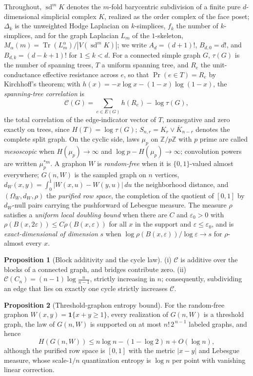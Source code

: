 \documentclass[11pt]{article}
\theoremstyle{definition}
\newtheorem{proposition}{Proposition}
\begin{document}
Throughout, $\operatorname{sd}^mK$ denotes the $m$-fold barycentric subdivision of a finite pure $d$-dimensional simplicial complex $K$, realized as the order complex of the face poset; $\Delta_k$ is the unweighted Hodge Laplacian on $k$-simplices, $f_k$ the number of $k$-simplices, and for the graph Laplacian $L_m$ of the $1$-skeleton, $M_\alpha(m)=\operatorname{Tr}(L_m^\alpha)/|V(\operatorname{sd}^mK)|$; we write $A_d=(d+1)!$, $B_{d,0}=d!$, and $B_{d,k}=(d-k+1)!$ for $1\le k<d$.  For a connected simple graph $G$, $\tau(G)$ is the number of spanning trees, $T$ a uniform spanning tree, and $R_e$ the unit-conductance effective resistance across $e$, so that $\Pr(e\in T)=R_e$ by Kirchhoff's theorem; with $h(x)=-x\log x-(1-x)\log(1-x)$, the \emph{spanning-tree correlation} is
\[
\mathcal C(G)=\sum_{e\in E(G)}h(R_e)-\log\tau(G),
\]
the total correlation of the edge-indicator vector of $T$, nonnegative and zero exactly on trees, since $H(T)=\log\tau(G)$; $S_{n,r}=K_r\vee\overline{K}_{n-r}$ denotes the complete split graph.  On the cyclic side, laws $\mu_p$ on $\mathbb Z/p\mathbb Z$ with $p$ prime are called \emph{mesoscopic} when $H(\mu_p)\to\infty$ and $\log p-H(\mu_p)\to\infty$; convolution powers are written $\mu_p^{*m}$.  A graphon $W$ is \emph{random-free} when it is $\{0,1\}$-valued almost everywhere; $G(n,W)$ is the sampled graph on $n$ vertices, $d_W(x,y)=\int_0^1|W(x,u)-W(y,u)|\,du$ the neighborhood distance, and $(\Omega_W,d_W,\rho)$ the \emph{purified row space}, the completion of the quotient of $[0,1]$ by $d_W$-null pairs carrying the pushforward of Lebesgue measure.  The measure $\rho$ satisfies a \emph{uniform local doubling bound} when there are $C$ and $\varepsilon_0>0$ with $\rho(B(x,2\varepsilon))\le C\rho(B(x,\varepsilon))$ for all $x$ in the support and $\varepsilon\le\varepsilon_0$, and is \emph{exact-dimensional of dimension} $s$ when $\log\rho(B(x,\varepsilon))/\log\varepsilon\to s$ for $\rho$-almost every $x$.

\begin{proposition}[Block additivity and the cycle law]\label{ac:ust}
(i) $\mathcal C$ is additive over the blocks of a connected graph, and bridges contribute zero.  (ii) $\mathcal C(C_n)=(n-1)\log\frac n{n-1}$, strictly increasing in $n$; consequently, subdividing an edge that lies on exactly one cycle strictly increases $\mathcal C$.
\end{proposition}

\begin{proposition}[Threshold-graphon entropy bound]\label{ac:threshold}
For the random-free graphon $W(x,y)=\mathbf 1\{x+y\ge1\}$, every realization of $G(n,W)$ is a threshold graph, the law of $G(n,W)$ is supported on at most $n!\,2^{\,n-1}$ labeled graphs, and hence
\[
H(G(n,W))\le n\log n-(1-\log2)\,n+O(\log n),
\]
although the purified row space is $[0,1]$ with the metric $|x-y|$ and Lebesgue measure, whose scale-$1/n$ quantization entropy is $\log n$ per point with vanishing linear correction.
\end{proposition}
\end{document}
